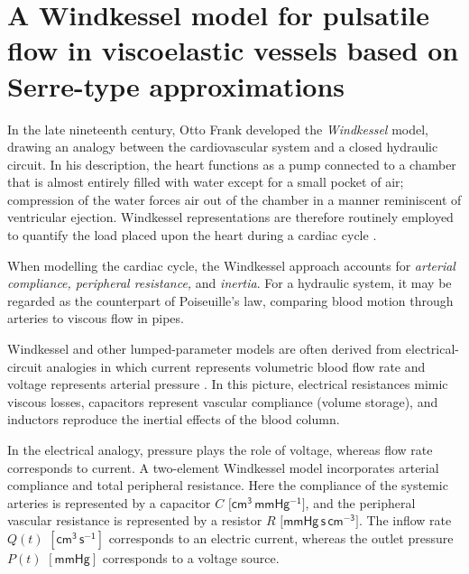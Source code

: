 \documentclass[alpha-refs, 12pt]{wiley-article}
\begin{document}
\printendnotes

\printglossary[type=\acronymtype]



\appendix
\section{A Windkessel model for pulsatile flow in viscoelastic vessels based on Serre-type approximations}\label{sec:windkessel}

In the late nineteenth century, Otto Frank developed the \emph{Windkessel} model, drawing an analogy between the cardiovascular system and a closed hydraulic circuit. In his description, the heart functions as a pump connected to a chamber that is almost entirely filled with water except for a small pocket of air; compression of the water forces air out of the chamber in a manner reminiscent of ventricular ejection. Windkessel representations are therefore routinely employed to quantify the load placed upon the heart during a cardiac cycle \cite{Catanho2012}.

When modelling the cardiac cycle, the Windkessel approach accounts for \emph{arterial compliance, peripheral resistance,} and \emph{inertia}. For a hydraulic system, it may be regarded as the counterpart of Poiseuille's law, comparing blood motion through arteries to viscous flow in pipes.

Windkessel and other lumped-parameter models are often derived from electrical-circuit analogies in which current represents volumetric blood flow rate and voltage represents arterial pressure \cite{Avolio1980, Segers1998, Milisic2004}. In this picture, electrical resistances mimic viscous losses, capacitors represent vascular compliance (volume storage), and inductors reproduce the inertial effects of the blood column.

In the electrical analogy, pressure plays the role of voltage, whereas flow rate corresponds to current. A two-element Windkessel model incorporates arterial compliance and total peripheral resistance. Here the compliance of the systemic arteries is represented by a capacitor \(\!C\) \(\bigl[\mathsf{cm^{3}\,mmHg^{-1}}\bigr]\), and the peripheral vascular resistance is represented by a resistor \(R\) \(\bigl[\mathsf{mmHg\,s\,cm^{-3}}\bigr]\). The inflow rate \(Q(t)\) \([\mathsf{cm^{3}\,s^{-1}}]\) corresponds to an electric current, whereas the outlet pressure \(P(t)\) \([\mathsf{mmHg}]\) corresponds to a voltage source.
\end{document}
